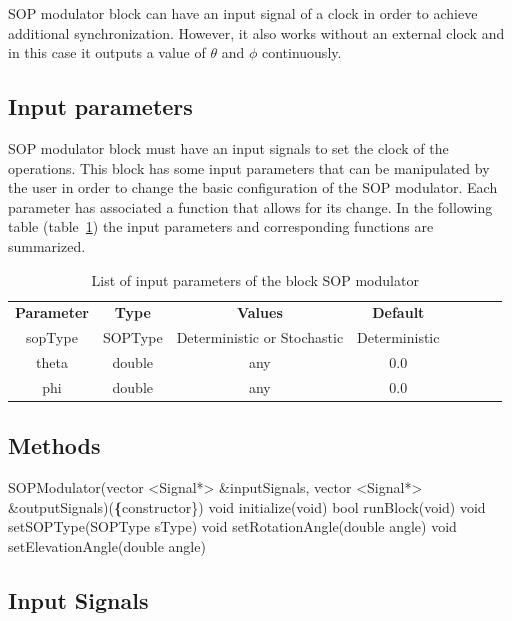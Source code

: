 SOP modulator block can have an input signal of a clock in order to achieve additional synchronization. However, it also works without an external clock and in this case it outputs a value of $\theta$ and $\phi$ continuously.


\subsection*{Input parameters}

SOP modulator block must have an input signals to set the clock of the operations. This block has some input parameters that can be manipulated by the user in order to change the basic configuration of the SOP modulator. Each parameter has associated a function that allows for its change. In the following table (table~\ref{table:sopmodulator_in_par}) the input parameters and corresponding functions are summarized.

\begin{table}[h]
	\centering
	\begin{tabular}{|c|c|c|c|cccc}
		\cline{1-4}
		\textbf{Parameter} & \textbf{Type} & \textbf{Values} &   \textbf{Default}& \\ \cline{1-4}
		sopType & SOPType & Deterministic or Stochastic & Deterministic \\ \cline{1-4}
		theta & double & any & 0.0 \\ \cline{1-4}
		phi & double & any & 0.0 \\ \cline{1-4}
	\end{tabular}
	\caption{List of input parameters of the block SOP modulator}
	\label{table:sopmodulator_in_par}
\end{table}


\subsection*{Methods}

SOPModulator(vector <Signal*> \&inputSignals, vector <Signal*> \&outputSignals)(\textbf\{constructor\})
\bigbreak
void initialize(void)
\bigbreak
bool runBlock(void)
\bigbreak
void setSOPType(SOPType sType)
\bigbreak
void setRotationAngle(double angle)
\bigbreak
void setElevationAngle(double angle)
\bigbreak



\subsection*{Input Signals}


